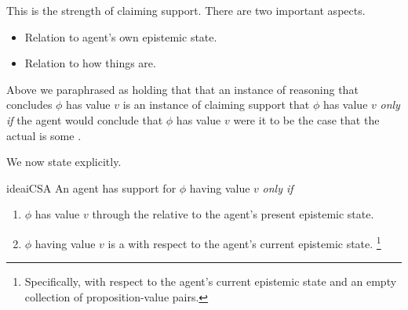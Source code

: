 \begin{note}
  \color{red}
  This is the strength of claiming support.
  There are two important aspects.
  \begin{itemize}
  \item Relation to agent's own epistemic state.
  \item Relation to how things are.
  \end{itemize}
\end{note}

\begin{note}
  Above we paraphrased \ideaS{} as holding that that an instance of reasoning that concludes \(\phi\) has value \(v\) is an instance of claiming support that \(\phi\) has value \(v\) \emph{only if} the agent would conclude that \(\phi\) has value \(v\) were it to be the case that the actual \world{} is some \epPAd{} \world{}.

  We now state \ideaS{} explicitly.
\end{note}

\begin{note}
  \begin{restatable}{idea}{iCSA}
    \label{idea:defs-for-CS}
    An agent \vAgent{} has support for \(\phi\) having value \(v\) \emph{only if}
    \begin{enumerate}
    \item
      \(\phi\) has value \(v\) through the  relative to the agent's present epistemic state.
    \item
    \(\phi\) having value \(v\) is a \sink{} with respect to the agent's current epistemic state.\nolinebreak
    \footnote{Specifically, with respect to the agent's current epistemic state and an empty collection of proposition-value pairs.}
  \end{enumerate}
\end{restatable}
\end{note}

